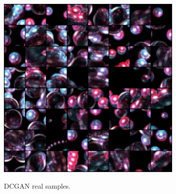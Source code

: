 \documentclass[letterpaper]{article} %
\begin{document}
\begin{figure}[h!]
\centering
\begin{subfigure}{0.45\textwidth}
\begin{center}
\begin{minipage}[t]{0.95\linewidth}
\begin{centering}
{\includegraphics[width=\linewidth]{dcgan_real.png}}
\caption{DCGAN real samples.}
\label{fig:dcgan_source}
\end{centering}
\end{minipage}
\end{center}
\end{subfigure}
\begin{subfigure}{0.45\textwidth}
\begin{center}
\begin{minipage}[t]{0.95\linewidth}
\begin{centering}

\end{centering}
\end{minipage}
\end{center}
\end{subfigure}
\end{figure}
\end{document}
